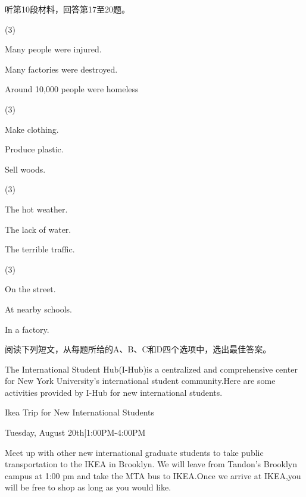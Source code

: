 \documentclass{英语试卷}
\begin{document}
\par 听第10段材料，回答第17至20题。\par
{}
\begin{choices}(3)
  \item Many people were injured.
  \item Many factories were destroyed.
  \item Around 10,000 people were homeless
\end{choices}
\begin{choices}(3)
  \item Make clothing.
  \item Produce plastic.
  \item Sell woods.
\end{choices}
\begin{choices}(3)
  \item The hot weather.
  \item The lack of water.
  \item The terrible traffic.
\end{choices}
\begin{choices}(3)
  \item On the street.
  \item At nearby schools.
  \item In a factory.
\end{choices}
\par 阅读下列短文，从每题所给的A、B、C和D四个选项中，选出最佳答案。\par
{}
\par The International Student Hub(I-Hub)is a centralized and comprehensive center for New York University's international student community.Here are some activities provided by I-Hub for new international students.\par
\par Ikea Trip for New International Students\par
\par Tuesday, August 20th|1:00PM-4:00PM\par
\par Meet up with other new international graduate students to take public transportation to the IKEA in Brooklyn. We will leave from Tandon's Brooklyn campus at 1:00 pm and take the MTA bus to IKEA.Once we arrive at IKEA,you will be free to shop as long as you would like.\par
\end{document}
